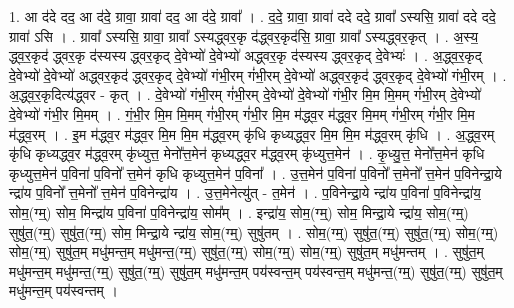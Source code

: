 \documentclass[17pt]{extarticle}
\begin{document}
1. आ द॑दे दद॒ आ द॑दे॒ ग्रावा॒ ग्रावा॑ दद॒ आ द॑दे॒ ग्रावा᳚ । . द॒दे॒ ग्रावा॒ ग्रावा॑ ददे ददे॒ ग्रावा᳚ ऽस्यसि॒ ग्रावा॑ ददे ददे॒ ग्रावा॑ ऽसि । . ग्रावा᳚ ऽस्यसि॒ ग्रावा॒ ग्रावा᳚ ऽस्यद्ध्वर॒कृ द॑द्ध्वर॒कृद॑सि॒ ग्रावा॒ ग्रावा᳚ ऽस्यद्ध्वर॒कृत् । . अ॒स्य॒ द्ध्व॒र॒कृद॑ द्ध्वर॒कृ द॑स्यस्य द्ध्वर॒कृद् दे॒वेभ्यो॑ दे॒वेभ्यो॑ अद्ध्वर॒कृ द॑स्यस्य द्ध्वर॒कृद् दे॒वेभ्यः॑ । . अ॒द्ध्व॒र॒कृद् दे॒वेभ्यो॑ दे॒वेभ्यो॑ अद्ध्वर॒कृद॑ द्ध्वर॒कृद् दे॒वेभ्यो॑ गंभी॒रम् गं॑भी॒रम् दे॒वेभ्यो॑ अद्ध्वर॒कृद॑ द्ध्वर॒कृद् दे॒वेभ्यो॑ गंभी॒रम् । . अ॒द्ध्व॒र॒कृदित्य॑द्ध्वर - कृत् । . दे॒वेभ्यो॑ गंभी॒रम् गं॑भी॒रम् दे॒वेभ्यो॑ दे॒वेभ्यो॑ गंभी॒र मि॒म मि॒मम् गं॑भी॒रम् दे॒वेभ्यो॑ दे॒वेभ्यो॑ गंभी॒र मि॒मम् । . गं॒भी॒र मि॒म मि॒मम् गं॑भी॒रम् गं॑भी॒र मि॒म म॑द्ध्व॒र म॑द्ध्व॒र मि॒मम् गं॑भी॒रम् गं॑भी॒र मि॒म म॑द्ध्व॒रम् । . इ॒म म॑द्ध्व॒र म॑द्ध्व॒र मि॒म मि॒म म॑द्ध्व॒रम् कृ॑धि कृध्यद्ध्व॒र मि॒म मि॒म म॑द्ध्व॒रम् कृ॑धि । . अ॒द्ध्व॒रम् कृ॑धि कृध्यद्ध्व॒र म॑द्ध्व॒रम् कृ॑ध्युत्त॒ मेनो᳚त्त॒मेन॑ कृध्यद्ध्व॒र म॑द्ध्व॒रम् कृ॑ध्युत्त॒मेन॑ । . कृ॒ध्यु॒त्त॒ मेनो᳚त्त॒मेन॑ कृधि कृध्युत्त॒मेन॑ प॒विना॑ प॒विनो᳚ त्त॒मेन॑ कृधि कृध्युत्त॒मेन॑ प॒विना᳚ । . उ॒त्त॒मेन॑ प॒विना॑ प॒विनो᳚ त्त॒मेनो᳚ त्त॒मेन॑ प॒विनेन्द्रा॒ये न्द्रा॑य प॒विनो᳚ त्त॒मेनो᳚ त्त॒मेन॑ प॒विनेन्द्रा॑य । . उ॒त्त॒मेनेत्यु॑त् - त॒मेन॑ । . प॒विनेन्द्रा॒ये न्द्रा॑य प॒विना॑ प॒विनेन्द्रा॑य॒ सोम॒(ग्म्॒) सोम॒ मिन्द्रा॑य प॒विना॑ प॒विनेन्द्रा॑य॒ सोम᳚म् । . इन्द्रा॑य॒ सोम॒(ग्म्॒) सोम॒ मिन्द्रा॒ये न्द्रा॑य॒ सोम॒(ग्म्॒) सुषु॑त॒(ग्म्॒) सुषु॑त॒(ग्म्॒) सोम॒ मिन्द्रा॒ये न्द्रा॑य॒ सोम॒(ग्म्॒) सुषु॑तम् । . सोम॒(ग्म्॒) सुषु॑त॒(ग्म्॒) सुषु॑त॒(ग्म्॒) सोम॒(ग्म्॒) सोम॒(ग्म्॒) सुषु॑त॒म् मधु॑मन्त॒म् मधु॑मन्त॒(ग्म्॒) सुषु॑त॒(ग्म्॒) सोम॒(ग्म्॒) सोम॒(ग्म्॒) सुषु॑त॒म् मधु॑मन्तम् । . सुषु॑त॒म् मधु॑मन्त॒म् मधु॑मन्त॒(ग्म्॒) सुषु॑त॒(ग्म्॒) सुषु॑त॒म् मधु॑मन्त॒म् पय॑स्वन्त॒म् पय॑स्वन्त॒म् मधु॑मन्त॒(ग्म्॒) सुषु॑त॒(ग्म्॒) सुषु॑त॒म् मधु॑मन्त॒म् पय॑स्वन्तम् । \newline
\end{document}
